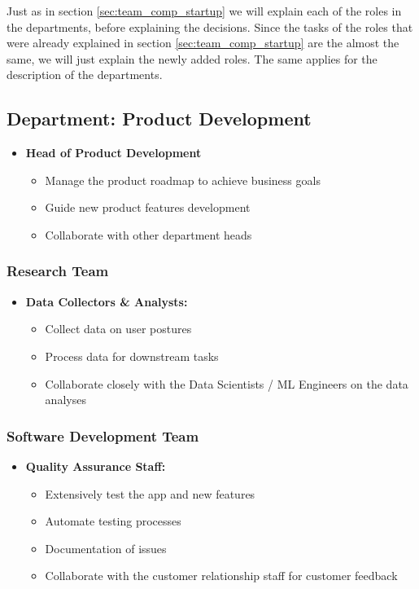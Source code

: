 Just as in section \ref{sec:team_comp_startup} we will explain each of the roles in the departments, before explaining the decisions.
Since the tasks of the roles that were already explained in section \ref{sec:team_comp_startup} are the almost the same, we will just explain the newly added roles.
The same applies for the description of the departments.

\subsection{Department: Product Development}
\begin{itemize}
    \item \textbf{Head of Product Development}
            \begin{itemize}
                \item Manage the product roadmap to achieve business goals
                \item Guide new product features development
                \item Collaborate with other department heads
            \end{itemize}    
\end{itemize}

\subsubsection*{Research Team}
\begin{itemize}
    \item \textbf{Data Collectors \& Analysts:}
            \begin{itemize}
                \item Collect data on user postures
                \item Process data for downstream tasks
                \item Collaborate closely with the Data Scientists / ML Engineers on the data analyses
            \end{itemize}
\end{itemize}

\subsubsection*{Software Development Team}
\begin{itemize}
    \item \textbf{Quality Assurance Staff:}
            \begin{itemize}
                \item Extensively test the app and new features
                \item Automate testing processes
                \item Documentation of issues
                \item Collaborate with the customer relationship staff for customer feedback
            \end{itemize}    
\end{itemize}

